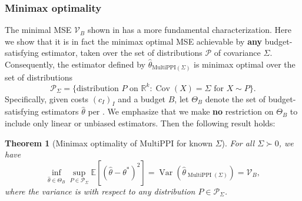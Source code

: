 \documentclass{article} %
\newcommand{\R}{\mathbb{R}}
\newcommand{\Ex}{\mathbb{E}}
\DeclareMathOperator{\Var}{Var}
\DeclareMathOperator{\Cov}{Cov}
\DeclareMathOperator{\multiPPI}{MultiPPI}
\newtheorem{theorem}{Theorem}
\begin{document}
\subsubsection{Minimax optimality}
The minimal MSE $\mathcal{V}_B$ shown in  has a more fundamental characterization. Here we show that it is in fact the minimax optimal MSE achievable by \textbf{any} budget-satisfying estimator, taken over the set of distributions $\mathcal{P}$ of covariance $\Sigma$. Consequently, the estimator defined by $\hat{\theta}_{\text{MultiPPI}(\Sigma)}$ is minimax optimal over the set of distributions $$\mathcal{P}_\Sigma = \{\text{distribution }P\text{ on }\mathbb{R}^k \colon \Cov(X) = \Sigma\text{ for }X \sim P\}.$$ 
%
Specifically, given costs $(c_I)_I$ and a budget $B$, let $\Theta_B$ denote the set of budget-satisfying estimators $\hat{\theta}$ per . We emphasize that we make \textbf{no}  restriction on $\Theta_B$ to include only linear or unbiased estimators. 
 Then the following result holds:
 
\begin{theorem}[Minimax optimality of MultiPPI for known $\Sigma$]
\label{thm:minimax}
For all $\Sigma\succ0$, we have
    \[
    \inf_{\hat{\theta}\in\Theta_B}\sup_{P\in\mathcal{P}_\Sigma} \Ex\left[(\hat{\theta}-\theta^*)^2\right] = \Var 
    \left(\hat{\theta}_{\multiPPI(\Sigma)}\right) = \mathcal{V}_B,
    \]
    where the variance is with respect to any distribution $P\in\mathcal{P}_\Sigma$.
\end{theorem}


\end{document}

